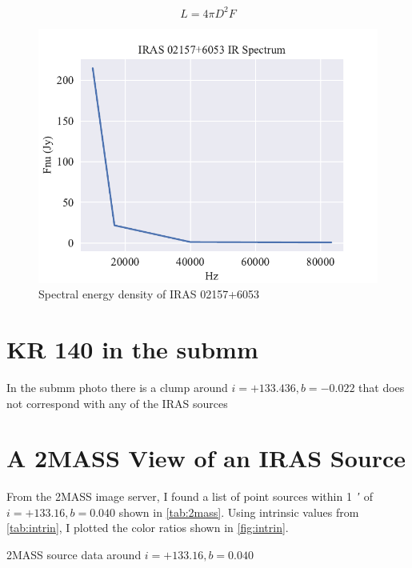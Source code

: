 \documentclass[]{article}
\begin{document}
\begin{equation}
L=4\pi D^2 F
\label{eqn:lum}
\end{equation}

\begin{figure}[H]
	\centering
	\includegraphics[]{figs/spectrum.pdf}
	\caption{Spectral energy density of IRAS 02157+6053}
	\label{fig:spectrum}
\end{figure}


\section{KR 140 in the submm}

In the submm photo there is a clump around $i=+133.436, b=-0.022$ that does not correspond with any of the IRAS sources

\section{A 2MASS View of an IRAS Source}

From the 2MASS image server, I found a list of point sources within \SI{1}{\arcminute} of $i=+133.16, b=0.040$ shown in \autoref{tab:2mass}. Using intrinsic values from \autoref{tab:intrin}, I plotted the color ratios shown in \autoref{fig:intrin}.
\begin{table}[H]
	\centering
	\caption{2MASS source data around $i=+133.16, b=0.040$}
	\label{tab:2mass}
\end{table}
\end{document}
